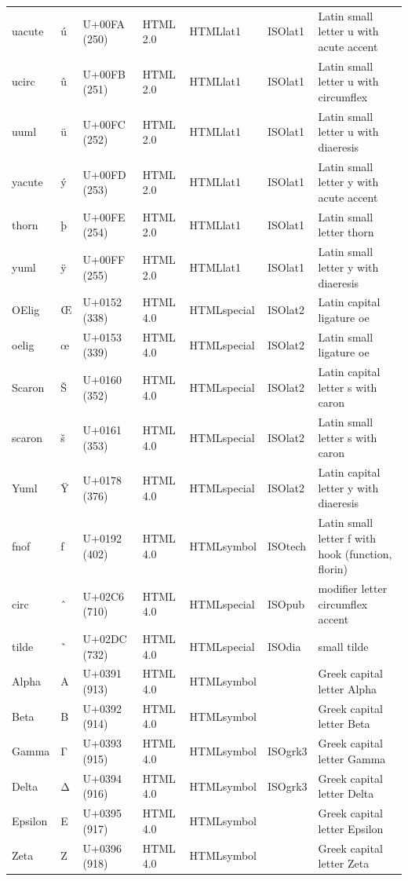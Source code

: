 \documentclass{article}
\begin{document}
\begin{tabular}{lllllll}
uacute & ú & U+00FA (250) & HTML 2.0 & HTMLlat1 & ISOlat1 & Latin small letter u with acute accent \\
ucirc & û & U+00FB (251) & HTML 2.0 & HTMLlat1 & ISOlat1 & Latin small letter u with circumflex \\
uuml & ü & U+00FC (252) & HTML 2.0 & HTMLlat1 & ISOlat1 & Latin small letter u with diaeresis \\
yacute & ý & U+00FD (253) & HTML 2.0 & HTMLlat1 & ISOlat1 & Latin small letter y with acute accent \\
thorn & þ & U+00FE (254) & HTML 2.0 & HTMLlat1 & ISOlat1 & Latin small letter thorn \\
yuml & ÿ & U+00FF (255) & HTML 2.0 & HTMLlat1 & ISOlat1 & Latin small letter y with diaeresis \\
OElig & Œ & U+0152 (338) & HTML 4.0 & HTMLspecial & ISOlat2 & Latin capital ligature oe \\
oelig & œ & U+0153 (339) & HTML 4.0 & HTMLspecial & ISOlat2 & Latin small ligature oe \\
Scaron & Š & U+0160 (352) & HTML 4.0 & HTMLspecial & ISOlat2 & Latin capital letter s with caron \\
scaron & š & U+0161 (353) & HTML 4.0 & HTMLspecial & ISOlat2 & Latin small letter s with caron \\
Yuml & Ÿ & U+0178 (376) & HTML 4.0 & HTMLspecial & ISOlat2 & Latin capital letter y with diaeresis \\
fnof & ƒ & U+0192 (402) & HTML 4.0 & HTMLsymbol & ISOtech & Latin small letter f with hook (function, florin) \\
circ & ˆ & U+02C6 (710) & HTML 4.0 & HTMLspecial & ISOpub & modifier letter circumflex accent \\
tilde & ˜ & U+02DC (732) & HTML 4.0 & HTMLspecial & ISOdia & small tilde \\
Alpha & Α & U+0391 (913) & HTML 4.0 & HTMLsymbol &  & Greek capital letter Alpha \\
Beta & Β & U+0392 (914) & HTML 4.0 & HTMLsymbol &  & Greek capital letter Beta \\
Gamma & Γ & U+0393 (915) & HTML 4.0 & HTMLsymbol & ISOgrk3 & Greek capital letter Gamma \\
Delta & Δ & U+0394 (916) & HTML 4.0 & HTMLsymbol & ISOgrk3 & Greek capital letter Delta \\
Epsilon & Ε & U+0395 (917) & HTML 4.0 & HTMLsymbol &  & Greek capital letter Epsilon \\
Zeta & Ζ & U+0396 (918) & HTML 4.0 & HTMLsymbol &  & Greek capital letter Zeta \\

\end{tabular}
\end{document}
